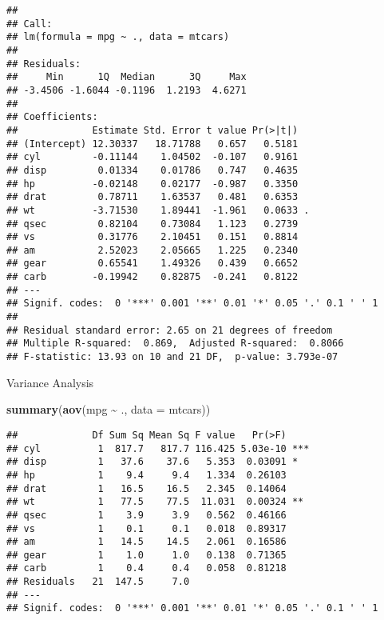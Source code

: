 \documentclass[
]{article}
\newenvironment{Shaded}{\begin{snugshade}}{\end{snugshade}}
\newcommand{\AttributeTok}[1]{\textcolor[rgb]{0.13,0.29,0.53}{#1}}
\newcommand{\FunctionTok}[1]{\textcolor[rgb]{0.13,0.29,0.53}{\textbf{#1}}}
\newcommand{\NormalTok}[1]{#1}
\newcommand{\SpecialCharTok}[1]{\textcolor[rgb]{0.81,0.36,0.00}{\textbf{#1}}}
\begin{document}
\begin{verbatim}
## 
## Call:
## lm(formula = mpg ~ ., data = mtcars)
## 
## Residuals:
##     Min      1Q  Median      3Q     Max 
## -3.4506 -1.6044 -0.1196  1.2193  4.6271 
## 
## Coefficients:
##             Estimate Std. Error t value Pr(>|t|)  
## (Intercept) 12.30337   18.71788   0.657   0.5181  
## cyl         -0.11144    1.04502  -0.107   0.9161  
## disp         0.01334    0.01786   0.747   0.4635  
## hp          -0.02148    0.02177  -0.987   0.3350  
## drat         0.78711    1.63537   0.481   0.6353  
## wt          -3.71530    1.89441  -1.961   0.0633 .
## qsec         0.82104    0.73084   1.123   0.2739  
## vs           0.31776    2.10451   0.151   0.8814  
## am           2.52023    2.05665   1.225   0.2340  
## gear         0.65541    1.49326   0.439   0.6652  
## carb        -0.19942    0.82875  -0.241   0.8122  
## ---
## Signif. codes:  0 '***' 0.001 '**' 0.01 '*' 0.05 '.' 0.1 ' ' 1
## 
## Residual standard error: 2.65 on 21 degrees of freedom
## Multiple R-squared:  0.869,  Adjusted R-squared:  0.8066 
## F-statistic: 13.93 on 10 and 21 DF,  p-value: 3.793e-07
\end{verbatim}

Variance Analysis

\begin{Shaded}
\begin{Highlighting}[]
\FunctionTok{summary}\NormalTok{(}\FunctionTok{aov}\NormalTok{(mpg }\SpecialCharTok{\textasciitilde{}}\NormalTok{ ., }\AttributeTok{data =}\NormalTok{ mtcars))}
\end{Highlighting}
\end{Shaded}

\begin{verbatim}
##             Df Sum Sq Mean Sq F value   Pr(>F)    
## cyl          1  817.7   817.7 116.425 5.03e-10 ***
## disp         1   37.6    37.6   5.353  0.03091 *  
## hp           1    9.4     9.4   1.334  0.26103    
## drat         1   16.5    16.5   2.345  0.14064    
## wt           1   77.5    77.5  11.031  0.00324 ** 
## qsec         1    3.9     3.9   0.562  0.46166    
## vs           1    0.1     0.1   0.018  0.89317    
## am           1   14.5    14.5   2.061  0.16586    
## gear         1    1.0     1.0   0.138  0.71365    
## carb         1    0.4     0.4   0.058  0.81218    
## Residuals   21  147.5     7.0                     
## ---
## Signif. codes:  0 '***' 0.001 '**' 0.01 '*' 0.05 '.' 0.1 ' ' 1
\end{verbatim}
\end{document}
